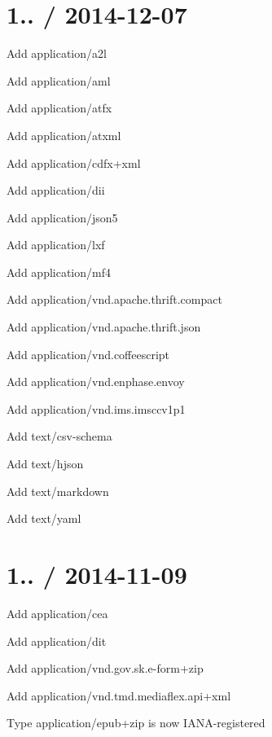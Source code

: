 \section*{1.. / 2014-\/12-\/07 }


\begin{DoxyItemize}
\item Add {\ttfamily application/a2l}
\item Add {\ttfamily application/aml}
\item Add {\ttfamily application/atfx}
\item Add {\ttfamily application/atxml}
\item Add {\ttfamily application/cdfx+xml}
\item Add {\ttfamily application/dii}
\item Add {\ttfamily application/json5}
\item Add {\ttfamily application/lxf}
\item Add {\ttfamily application/mf4}
\item Add {\ttfamily application/vnd.\+apache.\+thrift.\+compact}
\item Add {\ttfamily application/vnd.\+apache.\+thrift.\+json}
\item Add {\ttfamily application/vnd.\+coffeescript}
\item Add {\ttfamily application/vnd.\+enphase.\+envoy}
\item Add {\ttfamily application/vnd.\+ims.\+imsccv1p1}
\item Add {\ttfamily text/csv-\/schema}
\item Add {\ttfamily text/hjson}
\item Add {\ttfamily text/markdown}
\item Add {\ttfamily text/yaml}
\end{DoxyItemize}

\section*{1.. / 2014-\/11-\/09 }


\begin{DoxyItemize}
\item Add {\ttfamily application/cea}
\item Add {\ttfamily application/dit}
\item Add {\ttfamily application/vnd.\+gov.\+sk.\+e-\/form+zip}
\item Add {\ttfamily application/vnd.\+tmd.\+mediaflex.\+api+xml}
\item Type {\ttfamily application/epub+zip} is now I\+A\+N\+A-\/registered
\end{DoxyItemize}

